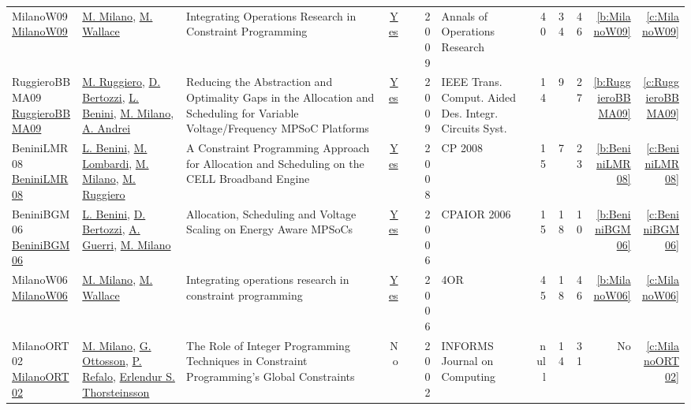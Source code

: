 {\begin{longtable}{>{\raggedright\arraybackslash}p{3cm}>{\raggedright\arraybackslash}p{6cm}>{\raggedright\arraybackslash}p{6.5cm}rrrp{2.5cm}rrrrr}
MilanoW09 \href{http://dx.doi.org/10.1007/s10479-009-0654-9}{MilanoW09} & \hyperref[auth:a144]{M. Milano}, \hyperref[auth:a117]{M. Wallace} & Integrating Operations Research in Constraint Programming & \href{works/MilanoW09.pdf}{Yes} & \cite{MilanoW09} & 2009 & Annals of Operations Research & 40 & 34 & 46 & \ref{b:MilanoW09} & \ref{c:MilanoW09}\\
RuggieroBBMA09 \href{https://doi.org/10.1109/TCAD.2009.2013536}{RuggieroBBMA09} & \hyperref[auth:a727]{M. Ruggiero}, \hyperref[auth:a381]{D. Bertozzi}, \hyperref[auth:a248]{L. Benini}, \hyperref[auth:a144]{M. Milano}, \hyperref[auth:a728]{A. Andrei} & Reducing the Abstraction and Optimality Gaps in the Allocation and Scheduling for Variable Voltage/Frequency MPSoC Platforms & \href{works/RuggieroBBMA09.pdf}{Yes} & \cite{RuggieroBBMA09} & 2009 & {IEEE} Trans. Comput. Aided Des. Integr. Circuits Syst. & 14 & 9 & 27 & \ref{b:RuggieroBBMA09} & \ref{c:RuggieroBBMA09}\\
BeniniLMR08 \href{http://dx.doi.org/10.1007/978-3-540-85958-1_2}{BeniniLMR08} & \hyperref[auth:a248]{L. Benini}, \hyperref[auth:a143]{M. Lombardi}, \hyperref[auth:a144]{M. Milano}, \hyperref[auth:a727]{M. Ruggiero} & A Constraint Programming Approach for Allocation and Scheduling on the CELL Broadband Engine & \href{works/BeniniLMR08.pdf}{Yes} & \cite{BeniniLMR08} & 2008 & CP 2008 & 15 & 7 & 23 & \ref{b:BeniniLMR08} & \ref{c:BeniniLMR08}\\
BeniniBGM06 \href{https://doi.org/10.1007/11757375\_6}{BeniniBGM06} & \hyperref[auth:a248]{L. Benini}, \hyperref[auth:a381]{D. Bertozzi}, \hyperref[auth:a382]{A. Guerri}, \hyperref[auth:a144]{M. Milano} & Allocation, Scheduling and Voltage Scaling on Energy Aware MPSoCs & \href{works/BeniniBGM06.pdf}{Yes} & \cite{BeniniBGM06} & 2006 & CPAIOR 2006 & 15 & 18 & 10 & \ref{b:BeniniBGM06} & \ref{c:BeniniBGM06}\\
MilanoW06 \href{http://dx.doi.org/10.1007/s10288-006-0019-z}{MilanoW06} & \hyperref[auth:a144]{M. Milano}, \hyperref[auth:a117]{M. Wallace} & Integrating operations research in constraint programming & \href{works/MilanoW06.pdf}{Yes} & \cite{MilanoW06} & 2006 & 4OR & 45 & 18 & 46 & \ref{b:MilanoW06} & \ref{c:MilanoW06}\\
MilanoORT02 \href{http://dx.doi.org/10.1287/ijoc.14.4.387.2830}{MilanoORT02} & \hyperref[auth:a144]{M. Milano}, \hyperref[auth:a950]{G. Ottosson}, \hyperref[auth:a257]{P. Refalo}, \hyperref[auth:a887]{Erlendur S. Thorsteinsson} & The Role of Integer Programming Techniques in Constraint Programming's Global Constraints & No & \cite{MilanoORT02} & 2002 & INFORMS Journal on Computing & null & 14 & 31 & No & \ref{c:MilanoORT02}\\

\end{longtable}}

